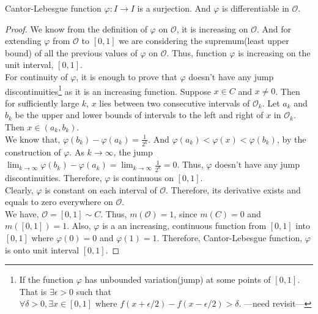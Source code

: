 \begin{theorem}
	Cantor-Lebesgue function $\varphi : I \to I$ is a surjection. And $\varphi$ is differentiable in $\mathcal{O}$.
\end{theorem}
\begin{proof}
	We know from the definition of $\varphi$ on $\mathcal{O}$, it is increasing on $\mathcal{O}$.
	And for extending $\varphi$ from $\mathcal{O}$ to $[0,1]$ we are considering the supremum(least upper bound) of all the previous values of $\varphi$ on $\mathcal{O}$.
	Thus, function $\varphi$ is increasing on the unit interval, $[0,1]$.\\

	For continuity of $\varphi$, it is enough to prove that $\varphi$ doesn't have any jump discontinuities\dag\footnote{
		If the function $\varphi$ has unbounded variation(jump) at some points of $[0,1]$.
		That is $\exists \epsilon > 0$ such that $\forall \delta > 0, \exists x \in [0,1] \text{ where } f(x+\epsilon/2)-f(x-\epsilon/2) > \delta$. ---need revisit---}
	as it is an increasing function.
	Suppose $x \in C$ and $x \ne 0$.
	Then for sufficiently large $k$, $x$ lies between two consecutive intervals of $\mathcal{O}_k$.
	Let $a_k$ and $b_k$ be the upper and lower bounds of intervals to the left and right of $x$ in $\mathcal{O}_k$.
	Then $x \in (a_k,b_k)$.\\

	We know that, $\varphi(b_k)-\varphi(a_k) = \frac{1}{2^k}$.
	And $\varphi(a_k) < \varphi(x) < \varphi(b_k)$, by the construction of $\varphi$.
	As $k \to \infty$, the jump $\displaystyle \lim_{k \to \infty} \varphi(b_k)-\varphi(a_k) = \lim_{k \to \infty} \frac{1}{2^k} = 0$.
	Thus, $\varphi$ doesn't have any jump discontinuities.
	Therefore, $\varphi$ is continuous on $[0,1]$.\\

	Clearly, $\varphi$ is constant on each interval of $\mathcal{O}$.
	Therefore, its derivative exists and equals to zero everywhere on $\mathcal{O}$.\\

	We have, $\mathcal{O} = [0,1] \sim C$.
	Thus, $m(\mathcal{O}) = 1$, since $m(C) = 0$ and $m([0,1]) = 1$.
	Also, $\varphi$ is a an increasing, continuous function from $[0,1]$ into $[0,1]$ where $\varphi(0) = 0$ and $\varphi(1) = 1$.
	Therefore, Cantor-Lebesgue function, $\varphi$ is onto unit interval $[0,1]$.
\end{proof}


